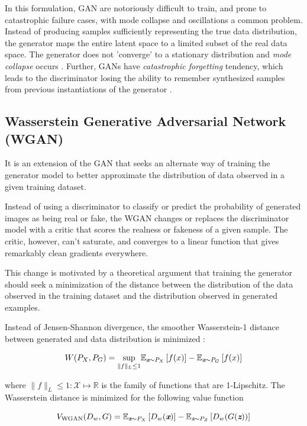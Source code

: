 \documentclass{article} %
\newcommand{\e}{\mathbb E}
\begin{document}
In this formulation, GAN are notoriously difficult to train, and prone to catastrophic failure cases, with mode collapse and oscillations a common problem. Instead of producing samples sufficiently representing the true data distribution, the generator maps the entire latent space to a limited subset of the real data space. The generator does not 'converge' to a stationary distribution and \textit{mode collapse} occurs \cite{che2017, srivastava2017}. Further, GANs have \textit{catastrophic forgetting} tendency, which leads to the discriminator losing the ability to remember synthesized samples from previous instantiations of the generator \cite{liang2018}.

\subsection{Wasserstein Generative Adversarial Network (WGAN)}
It is an extension of the GAN that seeks an alternate way of training the generator model to better approximate the distribution of data observed in a given training dataset.

Instead of using a discriminator to classify or predict the probability of generated images as being real or fake, the WGAN changes or replaces the discriminator model with a critic that scores the realness or fakeness of a given sample. The critic, however, can’t saturate, and converges to a linear function that gives remarkably clean gradients everywhere. 

This change is motivated by a theoretical argument that training the generator should seek a minimization of the distance between the distribution of the data observed in the training dataset and the distribution observed in generated examples.

Instead of Jensen-Shannon divergence, the smoother Wasserstein-1 distance between generated and data distribution is minimized \cite{arjovsky2017}:

\begin{equation}
    W(P_X,P_G) = \underset{\| f\| _L \leq 1}{\textrm{sup}} \e_{\textit{\textbf{x}}\sim P_X} \left[f(x)\right] - \e_{\textit{\textbf{x}}\sim P_G} \left[f(x)\right]
\end{equation}

where $\| f \| _L \leq 1 : \mathcal{X} \mapsto \mathbb{R}$ is the family of functions that are 1-Lipschitz. The Wasserstein distance is minimized for the following value function

\begin{equation}
    V_\textrm{WGAN}(D_w,G) = \e_{\textit{\textbf{x}}\sim P_X}\left[D_w(\textit{\textbf{x}})\right] - \e_{\textit{\textbf{z}}\sim P_Z}\left[D_w(G(\textit{\textbf{z}}))\right]
\end{equation}
\end{document}
